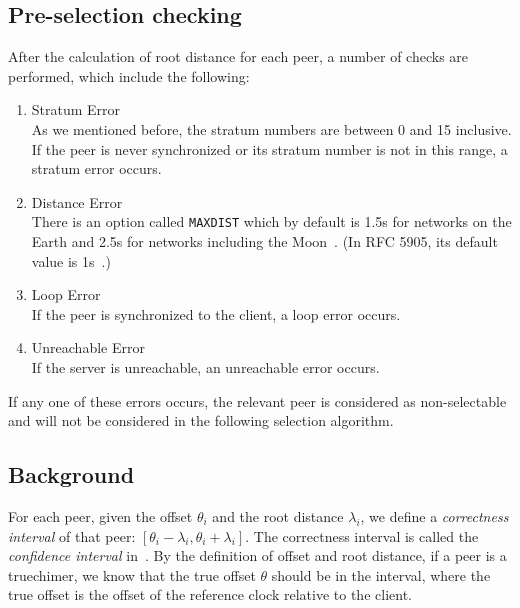 \subsection{Pre-selection checking}%
\label{sub:pre_selection_checking}
After the calculation of root distance for each peer, a number of checks are
performed, which include the following:
\begin{enumerate}
    \item Stratum Error\\
        As we mentioned before, the stratum numbers are between 0 and 15
        inclusive. If the peer is never synchronized or its stratum number is
        not in this range, a stratum error occurs.
    \item Distance Error\\
        There is an option called \verb|MAXDIST| which by default is 1.5s for
        networks on the Earth and 2.5s for networks including the
        Moon~\cite{clock_selection}. (In RFC 5905, its default value is
        1s~\cite{rfc5905}.)
    \item Loop Error\\
        If the peer is synchronized to the client, a loop error occurs.
    \item Unreachable Error\\
        If the server is unreachable, an unreachable error occurs.
\end{enumerate}
If any one of these errors occurs, the relevant peer is considered as
non-selectable and will not be considered in the following selection
algorithm.

\subsection{Background}%
\label{sub:selection_algorithm_background}

For each peer, given the offset $\theta_i$ and the root distance $\lambda_i$,
we define a \emph{correctness interval} of that peer: $[\theta_i - \lambda_i,
\theta_i + \lambda_i]$. The correctness interval is called the \emph{confidence
interval} in~\cite{redbook}. By the definition of offset and root distance, if
a peer is a truechimer, we know that the true offset $\theta$ should be in the
interval, where the true offset is the offset of the reference clock relative
to the client.

